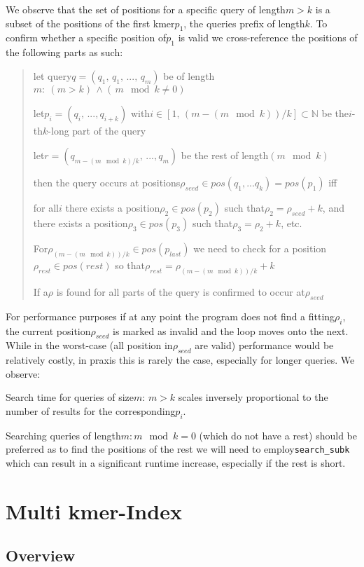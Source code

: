 We observe that the set of positions for a specific query of length$m>k$
is a subset of the positions of the first kmer$p_{1}$, the queries
prefix of length$k$. To confirm whether a specific position of$p_{1}$
is valid we cross-reference the positions of the following parts as
such:
\begin{verse}
let query$q=(q_{1},\,q_{1},\,...,\,q_{m})$ be of length$m:\:(m>k)\,\land(\,m\mod k\neq\text{0})$

let$p_{i}=(q_{i},\,...,q_{i+k})$ with$i\in[1,\,(m-(m\mod k))/k]\subset\mathbb{N}$
be the$i$-th$k$-long part of the query

let$r=(q_{m-(m\mod k)/k},\,...,q_{m})$ be the rest of length$(m\mod k)$

then the query occurs at positions$\rho_{seed}\in pos(q_{1},...q_{k})=pos(p_{1})$
iff

for all$i$ there exists a position$\rho_{2}\in pos(p_{2})$ such
that$\rho_{2}=\rho_{seed}+k$, and there exists a position$\rho_{3}\in pos(p_{3})$
such that$\rho_{3}=\rho_{2}+k$, etc.

For$\rho_{(m-(m\mod k))/k}\in pos(p_{last})$ we need to check for
a position$\rho_{rest}\in pos(rest)$ so that$\rho_{rest}=\rho_{(m-(m\mod k))/k}+k$

If a$\rho$ is found for all parts of the query is confirmed to occur
at$\rho_{seed}$
\end{verse}
For performance purposes if at any point the program does not find
a fitting$\rho_{i}$, the current position$\rho_{seed}$ is marked
as invalid and the loop moves onto the next. While in the worst-case
(all position in$\rho_{seed}$ are valid) performance would be relatively
costly, in praxis this is rarely the case, especially for longer queries.
We observe:
\begin{lem}
\label{Lemma 3}Search time for queries of size$m:\,m>k$ scales inversely
proportional to the number of results for the corresponding$p_{i}$.
\end{lem}
Searching queries of length$m:m\mod k=0$ (which do not have a rest)
should be preferred as to find the positions of the rest we will need
to employ\lstinline{search_subk} which can result in a significant
runtime increase, especially if the rest is short.\pagebreak{}

\chapter{Multi kmer-Index}

\section{\label{subsec: multi k overview}Overview}

